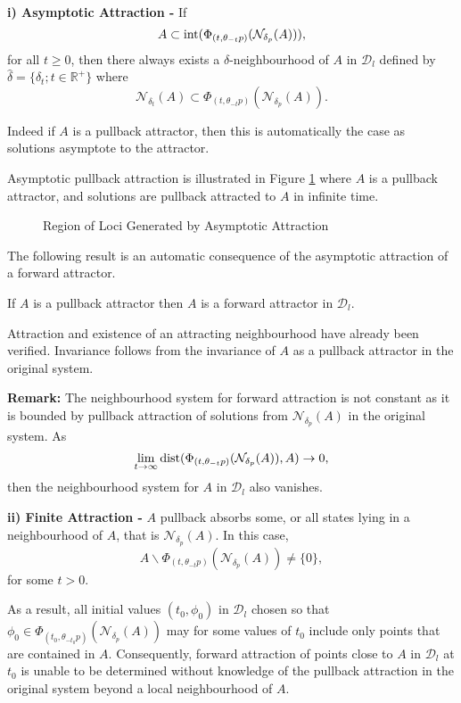 \textbf{i) Asymptotic Attraction - } If
\[ A \subset {\rm int} (\Phi_{(t, \theta_{-t}p)}(\mathcal{N}_{\delta_p}(A))), \]
for all $t \geq 0$, then there always exists a $\delta$-neighbourhood of $A$ in
$\mathcal{D}_l$ defined by  $\hat{\delta} = \{ \delta_t ; t
\in \mathbb{R}^+ \}$ where
\[ \mathcal{N}_{\delta_t}(A) \subset  \Phi_{(t,
\theta_{-t}p)}(\mathcal{N}_{\delta_p}(A)). \]


Indeed if $A$ is a pullback attractor, then this is automatically the case as
solutions asymptote to the attractor.

Asymptotic pullback attraction is illustrated in  Figure
\ref{loci1} where $A$ is a pullback attractor, and solutions are pullback
attracted to $A$ in infinite time.

\begin{figure}[htb]
\begin{center}
 \caption{Region of Loci Generated by Asymptotic Attraction}
\protect\label{loci1}
\end{center}
\end{figure}

The following result is an automatic consequence of the asymptotic attraction
of a forward attractor.
\begin{lemma}
\label{lemlociatt}
If $A$ is a pullback attractor then $A$ is a forward attractor in
$\mathcal{D}_l$.
\end{lemma}
\begin{prf}
Attraction and existence of an attracting neighbourhood have already been
verified. Invariance follows from the invariance of $A$ as a pullback attractor
in the original system.
\end{prf}

\textbf{Remark:} The neighbourhood system for forward attraction is
not constant as it is bounded by pullback attraction of solutions
from $\mathcal{N}_{\delta_p}(A)$ in the original system. As
\[ \lim_{t \to \infty} {\rm dist} (\Phi_{(t, \theta_{-t}p)}(
      \mathcal{N}_{\delta_p}(A)), A) \to 0, \]
then the neighbourhood system for $A$ in $\mathcal{D}_l$ also vanishes.

\textbf{ii) Finite Attraction - } $A$ pullback absorbs some, or
all states lying in a neighbourhood of $A$, that is $\mathcal{N}_{\delta_p}(A)$.
In this case,
\[ A \backslash \Phi_{(t, \theta_{-t}p)}(\mathcal{N}_{\delta_p}(A)) \neq \{0\},
\]
for some $t > 0$.

As a result, all initial values $(t_0, \phi_0)$ in $\mathcal{D}_l$ chosen so
that $\phi_0 \in \Phi_{(t_0, \theta_{-t_0}p)}(\mathcal{N}_{\delta_p}(A))$
may for some values of $t_0$ include only points that are contained in $A$.
Consequently, forward attraction of points close to $A$ in $\mathcal{D}_l$ at
$t_0$ is unable to be determined without knowledge of the pullback
attraction in the original system beyond a local neighbourhood of $A$.

